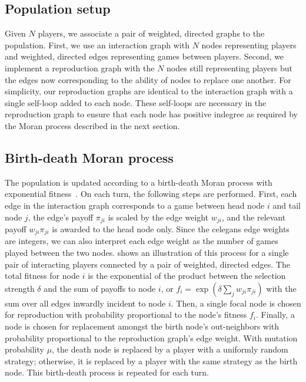 \documentclass[pdflatex,twocolumn,sn-nature,super]{sn-jnl}
\begin{document}
\subsection{Population setup}\label{sec:pop_setup}

Given $N$ players, we associate a pair
of weighted, directed graphs to the population.
First, we use an interaction graph with $N$ nodes representing players
and weighted, directed edges representing games between players.
Second, we implement a reproduction graph with the $N$ nodes
still representing players
but the edges now corresponding to the ability of nodes to replace one another.
For simplicity, our reproduction graphs are identical to the interaction graph
with a single self-loop added to each node.
These self-loops are necessary in the reproduction graph
to ensure that each node has positive indegree
as required by the Moran process described in the next section.

\subsection{Birth-death Moran process}\label{sec:evo_setup}
The population is updated according to a birth-death Moran process
with exponential fitness~\citep{lieberman2005evolutionary}.
On each turn, the following steps are performed.
First, each edge in the interaction graph corresponds to a game
between head node $i$ and tail node $j$,
the edge's payoff $\pi_{ji}$ is scaled by the edge weight $w_{ji}$,
and the relevant payoff $w_{ji} \pi_{ji}$ is awarded to the head node only.
Since the \gls{celegans} edge weights are integers,
we can also interpret each edge weight as the number of games played
between the two nodes.
 shows an illustration of this process
for a single pair of interacting players connected by a pair of
weighted, directed edges.
The total fitness for node $i$ is the exponential of the product
between the selection strength $\delta$
and the sum of payoffs to node $i$,
or $f_i = \exp(\delta \sum_j w_{ji} \pi_{ji})$ with the sum
over all edges inwardly incident to node $i$.
Then, a single focal node is chosen for reproduction
with probability proportional to the node's fitness $f_i$.
Finally, a node is chosen for replacement amongst the birth node's out-neighbors
with probability proportional to the reproduction graph's edge weight.
With mutation probability $\mu$,
the death node is replaced by a player with a uniformly random strategy;
otherwise, it is replaced by a player with the same strategy as the birth node.
This birth-death process is repeated for each turn.
\end{document}
